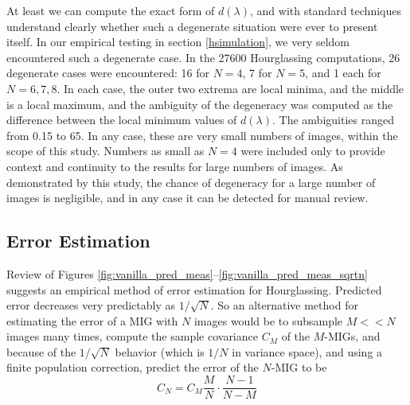 \documentclass[10pt]{amsart}
\begin{document}

At least we can compute the exact form of $d(\lambda)$, and with standard
techniques understand clearly whether such a degenerate situation were ever to
present itself. In our empirical testing in section \ref{hsimulation}, we very
seldom encountered such a degenerate case. In the 27600 Hourglassing
computations, 26 degenerate cases were encountered: 16 for $N=4$, 7 for $N=5$,
and 1 each for $N=6,7,8$. In each case, the outer two extrema are local minima,
and the middle is a local maximum, and the ambiguity of the degeneracy was
computed as the difference between the local minimum values of $d(\lambda)$. The
ambiguities ranged from 0.15 to 65. In any case, these are very small numbers of
images, within the scope of this study. Numbers as small as $N=4$ were included
only to provide context and continuity to the results for large numbers of
images. As demonstrated by this study, the chance of degeneracy for a large
number of images is negligible, and in any case it can be detected for manual
review.


\subsection{Error Estimation}
Review of Figures \ref{fig:vanilla_pred_meas}--\ref{fig:vanilla_pred_meas_sqrtn}
suggests an empirical meth\-od of error estimation for Hourglassing. Predicted
error decreases very predictably as $1/\sqrt N$. So an alternative method for
estimating the error of a MIG with $N$ images would be to subsample $M<<N$
images many times, compute the sample covariance $C_M$ of the $M$-MIGs, and
because of the $1/\sqrt N$ behavior (which is $1/N$ in variance space), and
using a finite population correction, predict the error of the $N$-MIG to
be $$C_N=C_M\frac{M}{N}\cdot\frac{N-1}{N-M}$$
\end{document}
